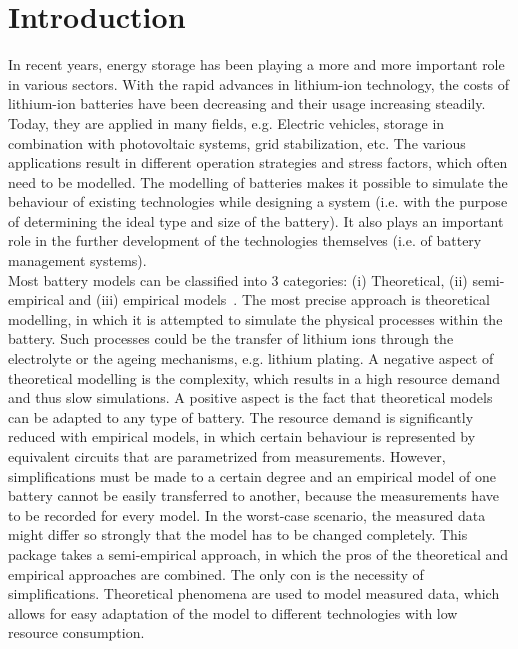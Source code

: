 \section{Introduction}
In recent years, energy storage has been playing a more and more important role in various sectors. With the rapid advances in lithium-ion technology, the costs of lithium-ion batteries have been decreasing and their usage increasing steadily. Today, they are applied in many fields, e.g. Electric vehicles, storage in combination with photovoltaic systems, grid stabilization, etc. The various applications result in different operation strategies and stress factors, which often need to be modelled. The modelling of batteries makes it possible to simulate the behaviour of existing technologies while designing a system (i.e. with the purpose of determining the ideal type and size of the battery). It also plays an important role in the further development of the technologies themselves (i.e. of battery management systems). \\
Most battery models can be classified into 3 categories: (i) Theoretical, (ii) semi-empirical and (iii) empirical models~\cite{cui_multi-stress_2015, xu_degradation-limiting_2013}. The most precise approach is theoretical modelling, in which it is attempted to simulate the physical processes within the battery. Such processes could be the transfer of lithium ions through the electrolyte or the ageing mechanisms, e.g. lithium plating. A negative aspect of theoretical modelling is the complexity, which results in a high resource demand and thus slow simulations. A positive aspect is the fact that theoretical models can be adapted to any type of battery. The resource demand is significantly reduced with empirical models, in which certain behaviour is represented by equivalent circuits that are parametrized from measurements. However, simplifications must be made to a certain degree and an empirical model of one battery cannot be easily transferred to another, because the measurements have to be recorded for every model. In the worst-case scenario, the measured data might differ so strongly that the model has to be changed completely. This package takes a semi-empirical approach, in which the pros of the theoretical and empirical approaches are combined. The only con is the necessity of simplifications. Theoretical phenomena are used to model measured data, which allows for easy adaptation of the model to different technologies with low resource consumption. \\
